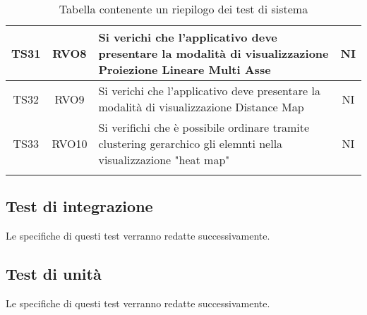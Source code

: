 \documentclass[../piano_di_qualifica.tex]{subfiles}
\begin{document}
\begin{center}
\begin{longtable}{|c|c|p{8.5cm}|c|}
		TS31  & RVO8 & Si verichi che l’applicativo deve presentare la modalità di visualizzazione Proiezione Lineare Multi Asse & NI \\ \hline
		TS32  & RVO9 & Si verichi che l’applicativo deve presentare la modalità di visualizzazione Distance Map & NI \\ \hline
		TS33  & RVO10 &  Si verifichi che è possibile ordinare tramite clustering gerarchico gli elemnti nella visualizzazione "heat map" & NI \\ \hline
		\hline
		\rowcolor{white}
		\caption{Tabella contenente un riepilogo dei test di sistema}
	\end{longtable}

\end{center}


\subsection{Test di integrazione}%
\label{sub:test_int}
Le specifiche di questi test verranno redatte successivamente.

\subsection{Test di unità}%
\label{sub:test_unit}
Le specifiche di questi test verranno redatte successivamente.
\end{document}
